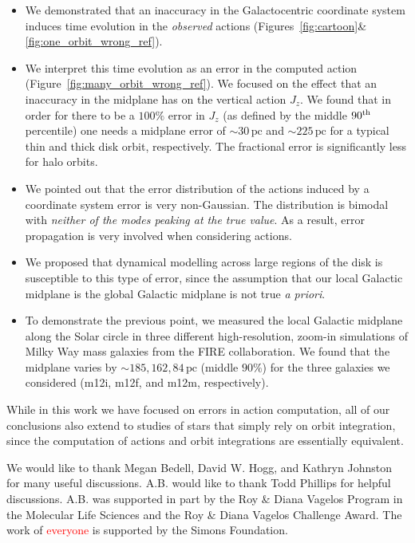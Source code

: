 \documentclass[twocolumn]{aastex62}
\newcommand{\Gus}[1]{\textcolor{red}{#1}}
\newcommand{\pc}{\text{pc}}
\newcommand{\uth}{\textsuperscript{th}}
\begin{document}
\begin{itemize}
\item We demonstrated that an inaccuracy in the Galactocentric coordinate
system induces time evolution in the {\em observed} actions
(Figures~\ref{fig:cartoon}\&\ref{fig:one_orbit_wrong_ref}). 

\item We interpret this time evolution as an error in the computed action
(Figure~\ref{fig:many_orbit_wrong_ref}). We focused on the effect that an
inaccuracy in the midplane has on the vertical action $J_z$. We found that in
order for there to be a $100\%$ error in $J_z$ (as defined by the middle
$90\uth$ percentile) one needs a midplane error of $\sim30\,\pc$ and
$\sim225\,\pc$ for a typical thin and thick disk orbit, respectively. The
fractional error is significantly less for halo orbits.

\item We pointed out that the error distribution of the actions induced by a
coordinate system error is very non-Gaussian. The distribution is bimodal with
{\em neither of the modes peaking at the true value}. As a result, error
propagation is very involved when considering actions.

\item We proposed that dynamical modelling across large regions of the disk is
susceptible to this type of error, since the assumption that our local
Galactic midplane is the global Galactic midplane is not true {\em a priori}.

\item To demonstrate the previous point, we measured the local Galactic
midplane along the Solar circle in three different high-resolution, zoom-in
simulations of Milky Way mass galaxies from the FIRE collaboration. We found
that the midplane varies by $\sim185, 162, 84\,\pc$ (middle $90\%$) for the
three galaxies we considered (m12i, m12f, and m12m, respectively).

\end{itemize}

While in this work we have focused on errors in action computation, all of our
conclusions also extend to studies of stars that simply rely on orbit
integration, since the computation of actions and orbit integrations are
essentially equivalent.

\acknowledgments
We would like to thank Megan Bedell, David W. Hogg, and Kathryn Johnston for
many useful discussions. A.B. would like to thank Todd Phillips for helpful
discussions. A.B. was supported in part by the Roy \& Diana Vagelos Program in
the Molecular Life Sciences and the Roy \& Diana Vagelos Challenge Award. The
work of \Gus{everyone} is supported by the Simons Foundation.
\end{document}
